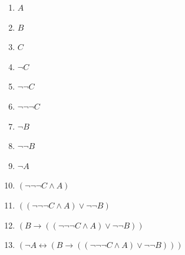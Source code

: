\documentclass[a4paper,12pt]{article}
\begin{document}
\begin{enumerate}
\item $A$
\item $B$
\item $C$
\item $\neg C$
\item $\neg\neg C$
\item $\neg\neg\neg C$
\item $\neg B$
\item $\neg\neg B$
\item $\neg A$
\item $(\neg\neg\neg C \wedge A)$
\item $((\neg\neg\neg C \wedge A) \vee \neg\neg B)$
\item $(B \to ((\neg\neg\neg C \wedge A) \vee \neg\neg B))$
\item $(\neg A \leftrightarrow (B \to ((\neg\neg\neg C \wedge A) \vee \neg\neg B)))$
\end{enumerate}

\newpage
\end{document}
